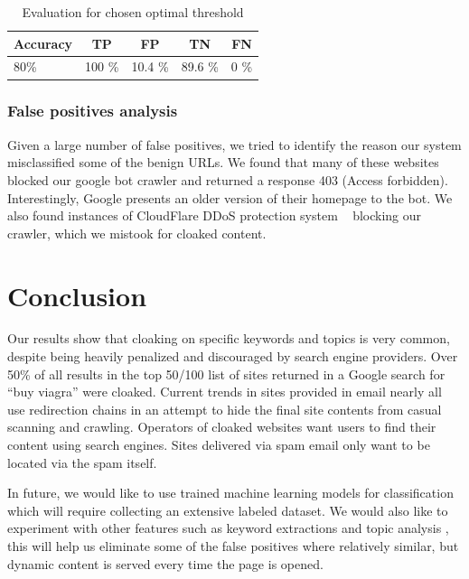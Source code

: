 \documentclass[letterpaper,twocolumn,10pt]{article}
\begin{document}
\begin{table}
\begin{center}
\begin{tabular}{|lcccc|}
\hline
{\bf Accuracy} & {\bf TP} & {\bf FP}  & {\bf TN} & {\bf FN}\\
\hline
80\% & 100 \% & 10.4 \% &  89.6 \% & 0 \%\\
\hline
\end{tabular}
\end{center}
\caption{Evaluation for chosen optimal threshold}\label{tab:eval}
\end{table}

\subsubsection{False positives analysis}
Given a large number of false positives, we tried to identify the reason our system misclassified some of the benign URLs. We found that many of these websites blocked our google bot crawler and returned a response 403 (Access forbidden). Interestingly, Google presents an older version of their homepage to the bot. We also found instances of CloudFlare DDoS protection system ~\cite{cloudflare} blocking our crawler, which we mistook for cloaked content.

\section{Conclusion}

Our results show that cloaking on specific keywords and topics is very common, despite being heavily penalized and discouraged by search engine providers. Over 50\% of all results in the top 50/100 list of sites returned in a Google search for ``buy viagra'' were cloaked. Current trends in sites provided in email nearly all use redirection chains in an attempt to hide the final site contents from casual scanning and crawling.  Operators of cloaked websites want users to find their content using search engines.  Sites delivered via spam email only want to be located via the spam itself.

In future, we would like to use trained machine learning models for classification which will require collecting an extensive labeled dataset. We would also like to experiment with other features such as keyword extractions \cite{Wu:2006:DSC:1135777.1135901} and topic analysis \cite{cloak}, this will help us eliminate some of the false positives where relatively similar, but dynamic content is served every time the page is opened.
{
  \small
  
  
}
\end{document}
